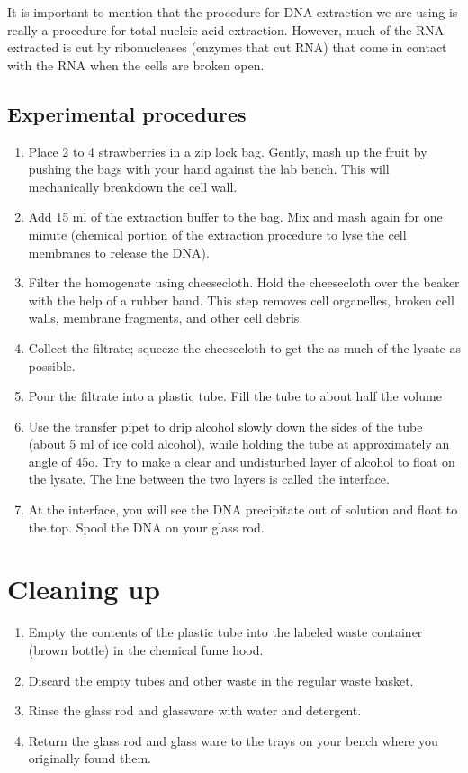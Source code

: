 It is important to mention that the procedure for DNA extraction we are
using is really a procedure for total nucleic acid extraction. However,
much of the RNA extracted is cut by ribonucleases (enzymes that cut RNA)
that come in contact with the RNA when the cells are broken open.

\subsection{Experimental procedures}\label{experimental-procedures-6}

\begin{enumerate}
\def\labelenumi{\arabic{enumi}.}
\tightlist
\item
  Place 2 to 4 strawberries in a zip lock bag. Gently, mash up the fruit
  by pushing the bags with your hand against the lab bench. This will
  mechanically breakdown the cell wall.
\item
  Add 15 ml of the extraction buffer to the bag. Mix and mash again for
  one minute (chemical portion of the extraction procedure to lyse the
  cell membranes to release the DNA).
\item
  Filter the homogenate using cheesecloth. Hold the cheesecloth over the
  beaker with the help of a rubber band. This step removes cell
  organelles, broken cell walls, membrane fragments, and other cell
  debris.
\item
  Collect the filtrate; squeeze the cheesecloth to get the as much of
  the lysate as possible.
\item
  Pour the filtrate into a plastic tube. Fill the tube to about half the
  volume
\item
  Use the transfer pipet to drip alcohol slowly down the sides of the
  tube (about 5 ml of ice cold alcohol), while holding the tube at
  approximately an angle of 45o. Try to make a clear and undisturbed
  layer of alcohol to float on the lysate. The line between the two
  layers is called the interface.
\item
  At the interface, you will see the DNA precipitate out of solution and
  float to the top. Spool the DNA on your glass rod.
\end{enumerate}

\section{Cleaning up}\label{cleaning-up-2}

\begin{enumerate}
\def\labelenumi{\arabic{enumi}.}
\tightlist
\item
  Empty the contents of the plastic tube into the labeled waste
  container (brown bottle) in the chemical fume hood.
\item
  Discard the empty tubes and other waste in the regular waste basket.
\item
  Rinse the glass rod and glassware with water and detergent.
\item
  Return the glass rod and glass ware to the trays on your bench where
  you originally found them.
\end{enumerate}

